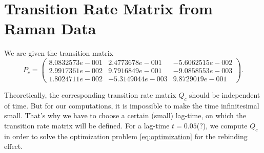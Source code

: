 \section{Transition Rate Matrix from Raman Data}


We are given the transition matrix
\begin{equation*}
P_c = 
\begin{pmatrix}
8.0832573e-001 & 2.4773678e-001 & -5.6062515e-002 \\
2.9917361e-002 & 9.7916849e-001 & -9.0858553e-003 \\
1.8024711e-002 & -5.3149044e-003 & 9.8729019e-001
\end{pmatrix}.
\end{equation*}

Theoretically, the corresponding transition rate matrix $Q_c$ should be independent of time. But for our computations, it is impossible to make the time infinitesimal small. That's why we have to choose a certain (small) lag-time, on which the transition rate matrix will be defined.
For a lag-time $t = 0.05$(?), we compute $Q_c$ in order to solve the optimization problem \eqref{eq:optimization} for the rebinding effect.